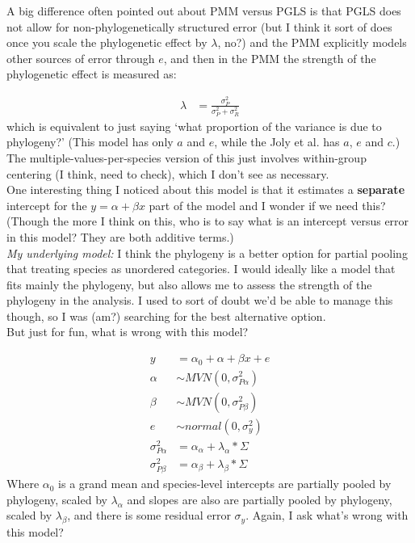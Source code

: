 \documentclass[11pt,letter]{article}
\begin{document}
A big difference often pointed out about PMM versus PGLS is that PGLS does not allow for non-phylogenetically structured error (but I think it sort of does once you scale the phylogenetic effect by $\lambda$, no?) and the PMM explicitly models other sources of error through $e$, and then in the PMM the strength of the phylogenetic effect is measured as:

\begin{align}
\lambda & = \frac{\sigma^2_P}{\sigma^2_P+\sigma^2_R}
\end{align}
which is equivalent to just saying `what proportion of the variance is due to phylogeny?' (This model has only $a$ and $e$, while the Joly et al. has $a$, $e$ and $c$.)\\

The multiple-values-per-species version of this just involves within-group centering (I think, need to check), which I don't see as necessary. \\

One interesting thing I noticed about this model is that it estimates a {\bf separate} intercept for the $y = \alpha + \beta x$ part of the model and I wonder if we need this? (Though the more I think on this, who is to say what is an intercept versus error in this model? They are both additive terms.) \\

\emph{My underlying model:} I think the phylogeny is a better option for partial pooling that treating species as unordered categories. I would ideally like a model that fits mainly the phylogeny, but also allows me to assess the strength of the phylogeny in the analysis. I used to sort of doubt we'd be able to manage this though, so I was (am?) searching for the best alternative option. \\

But just for fun, what is wrong with this model?

\begin{align}
y & = \alpha_0 + \alpha + \beta x + e\\
\alpha & \sim MVN(0, \sigma_{P\alpha}^2)\\
\beta & \sim MVN(0, \sigma_{P\beta}^2)\\
e & \sim normal(0, \sigma_y^2)\\
\sigma_{P\alpha}^2 & = \alpha_{\alpha} + \lambda_\alpha*\Sigma\\
\sigma_{P\beta}^2 & = \alpha_{\beta} + \lambda_\beta*\Sigma
\end{align}
Where $\alpha_0 $ is a grand mean and species-level intercepts are partially pooled by phylogeny, scaled by $\lambda_\alpha$ and slopes are also are partially pooled by phylogeny, scaled by $\lambda_\beta$, and there is some residual error $\sigma_y$. Again, I ask what's wrong with this model?\\
\end{document}
